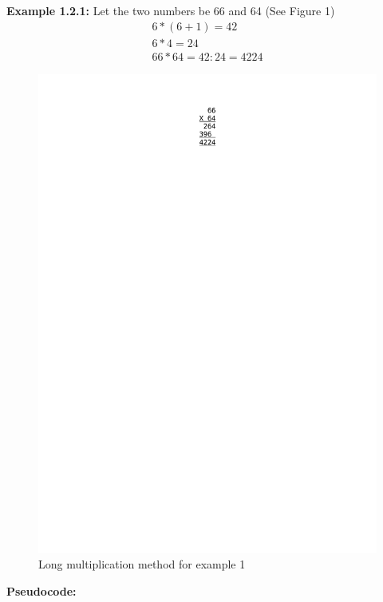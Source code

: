\documentclass{article}
\begin{document}
        \textbf{Example 1.2.1: } Let the two numbers be 66 and 64 (See Figure 1)
            \begin{align*}
                6*(6+1) = 42 \\
                6 * 4 = 24 \\
                66 * 64 = 42:24 = 4224
            \end{align*}
        \begin{figure}[h]
            \includegraphics[trim=67 700 0 60]{example1}
            \caption{Long multiplication method for example 1}
            \label{fig:example1}
        \end{figure}
        
        \textbf{Pseudocode: }
        
\end{document}
